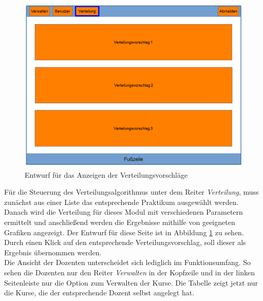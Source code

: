             \begin{figure}[t]
                \centering
                \includegraphics[width=\textwidth]{./design/images/MockUpsBackend/backendDistribution.png}
                \caption{Entwurf für das Anzeigen der Verteilungsvorschläge}
                \label{fig:mockupDistribution}
            \end{figure}
        	
        	Für die Steuerung des Verteilungsalgorithmus unter dem Reiter \textit{Verteilung}, muss zunächst aus einer Liste das entsprechende Praktikum ausgewählt werden.
            Danach wird die Verteilung für dieses Modul mit verschiedenen Parametern ermittelt und anschließend werden die Ergebnisse mithilfe von geeigneten Grafiken angezeigt.
            Der Entwurf für diese Seite ist in Abbildung \ref{fig:mockupDistribution} zu sehen.
            Durch einen Klick auf den entsprechende Verteilungsvorschlag, soll dieser als Ergebnis übernommen werden.\\
        	
        	Die Ansicht der Dozenten unterscheidet sich lediglich im Funktionsumfang.
        	So sehen die Dozenten nur den Reiter \textit{Verwalten} in der Kopfzeile und in der linken Seitenleiste nur die Option zum Verwalten der Kurse.
        	Die Tabelle zeigt jetzt nur die Kurse, die der entsprechende Dozent selbst angelegt hat.  
        	
        	
        	
        	
        	
        	
        	
        	
        	